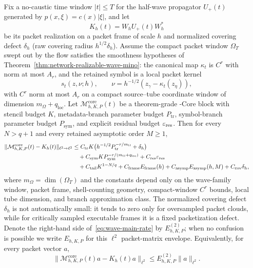 \begin{theorem}
\label{thm:wave-mino-core}
\label{thm:microlocal-propagation}
Fix a no-caustic time window $|t|\le T$ for the half-wave propagator $U_+(t)$ generated by $p(x,\xi)=c(x)|\xi|$, and let
\[
K_h(t)=W_hU_+(t)W_h^\ast
\]
be its packet realization on a packet frame of scale $h$ and normalized covering defect $\delta_h$ (raw covering radius $h^{1/2}\delta_h$). Assume the compact packet window $\Omega_T$ swept out by the flow satisfies the smoothness hypotheses of Theorem~\ref{thm:network-realizable-wave-mino}: the canonical map $\kappa_t$ is $C^r$ with norm at most $A_r$, and the retained symbol is a local packet kernel
\[
s_t(z,\nu;h),\qquad
\nu=h^{-1/2}(z_\gamma-\kappa_t(z_\eta)),
\]
with $C^r$ norm at most $A_r$ on a compact source--tube coordinate window of dimension $m_\Omega+q_{\mathrm{loc}}$.  Let $\mathcal M_{h,K,P}^{\mathrm{core}}(t)$ be a theorem-grade \MiNO-Core block with stencil budget $K$, metadata-branch parameter budget $P_{\mathrm{tr}}$, symbol-branch parameter budget $P_{\mathrm{sym}}$, and explicit residual budget $\varepsilon_{\mathrm{res}}$. Then for every $N>q+1$ and every retained asymptotic order $M\ge 1$,
\begin{align}
\label{eq:wave-main-rate}
\|\mathcal M_{h,K,P}^{\mathrm{core}}(t)-K_h(t)\|_{\ell^2\to\ell^2}
&\le
C_{\mathrm{tr}}K\bigl(h^{-1/2}P_{\mathrm{tr}}^{-r/m_\Omega}+\delta_h\bigr)
 \notag\\
&\quad+
C_{\mathrm{sym}}K P_{\mathrm{sym}}^{-r/(m_\Omega+q_{\mathrm{loc}})}
+
C_{\mathrm{res}}\varepsilon_{\mathrm{res}} \notag\\
&\quad +
C_{\mathrm{tail}}K^{1-N/q}
+
C_{\mathrm{frame}}E_{\mathrm{frame}}(h)
+C_{\mathrm{asymp}}E_{\mathrm{asymp}}(h,M)
+C_{\mathrm{cov}}\delta_h,
\end{align}
where $m_\Omega=\dim(\Omega_T)$ and the constants depend only on the wave-family window, packet frame, shell-counting geometry, compact-window $C^r$ bounds, local tube dimension, and branch approximation class.  The normalized covering defect $\delta_h$ is not automatically small: it tends to zero only for oversampled packet clouds, while for critically sampled executable frames it is a fixed packetization defect. Denote the right-hand side of~\eqref{eq:wave-main-rate} by $E_{h,K,P}^{(2)}$; when no confusion is possible we write $E_{h,K,P}$ for this $\ell^2$ packet-matrix envelope. Equivalently, for every packet vector $a$,
\[
\|\mathcal M_{h,K,P}^{\mathrm{core}}(t)a-K_h(t)a\|_{\ell^2}
\le
E_{h,K,P}^{(2)}\|a\|_{\ell^2}.
\]
\end{theorem}
